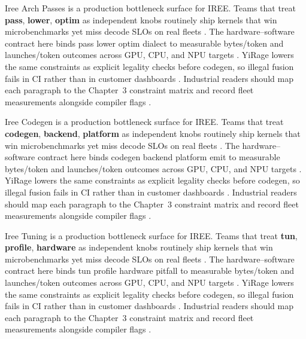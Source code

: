 Iree Arch Passes is a production bottleneck surface for IREE. Teams that treat \textbf{pass}, \textbf{lower}, \textbf{optim} as independent knobs routinely ship kernels that win microbenchmarks yet miss decode SLOs on real fleets \citep{nvidia2024cudagraphs,taxbreak2026}. The hardware--software contract here binds pass lower optim dialect to measurable bytes/token and launches/token outcomes across GPU, CPU, and NPU targets \citep{liu2024deepseekv3,memoryfloor2026}. YiRage lowers the same constraints as explicit legality checks before codegen, so illegal fusion fails in CI rather than in customer dashboards \citep{patel2025llminference,nvidia2022hopper}. Industrial readers should map each paragraph to the Chapter~3 constraint matrix and record fleet measurements alongside compiler flags \citep{taxbreak2026,semianalysis2024tma}.

Iree Codegen is a production bottleneck surface for IREE. Teams that treat \textbf{codegen}, \textbf{backend}, \textbf{platform} as independent knobs routinely ship kernels that win microbenchmarks yet miss decode SLOs on real fleets \citep{liu2024deepseekv3,memoryfloor2026}. The hardware--software contract here binds codegen backend platform emit to measurable bytes/token and launches/token outcomes across GPU, CPU, and NPU targets \citep{patel2025llminference,nvidia2022hopper}. YiRage lowers the same constraints as explicit legality checks before codegen, so illegal fusion fails in CI rather than in customer dashboards \citep{taxbreak2026,semianalysis2024tma}. Industrial readers should map each paragraph to the Chapter~3 constraint matrix and record fleet measurements alongside compiler flags \citep{memoryfloor2026,amd2024xdna}.

Iree Tuning is a production bottleneck surface for IREE. Teams that treat \textbf{tun}, \textbf{profile}, \textbf{hardware} as independent knobs routinely ship kernels that win microbenchmarks yet miss decode SLOs on real fleets \citep{patel2025llminference,nvidia2022hopper}. The hardware--software contract here binds tun profile hardware pitfall to measurable bytes/token and launches/token outcomes across GPU, CPU, and NPU targets \citep{taxbreak2026,semianalysis2024tma}. YiRage lowers the same constraints as explicit legality checks before codegen, so illegal fusion fails in CI rather than in customer dashboards \citep{memoryfloor2026,amd2024xdna}. Industrial readers should map each paragraph to the Chapter~3 constraint matrix and record fleet measurements alongside compiler flags \citep{nvidia2022hopper,amd2024aie}.


